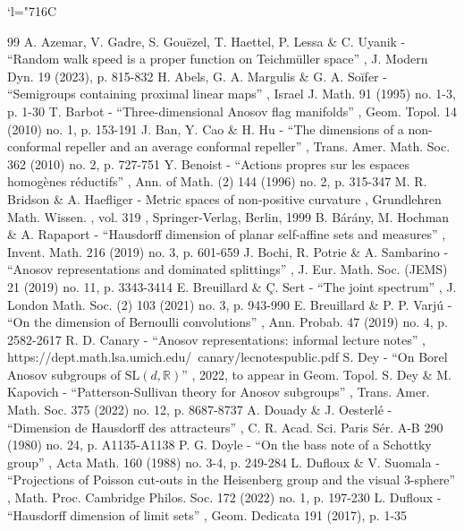 \documentclass[10pt]{amsart}
\newcommand{\Changelback}{\mathcode`l="716C}
\begin{document}
\Changelback


\begin{thebibliography}{99}
 A. Azemar, V. Gadre, S. Gouëzel, T. Haettel, P. Lessa \& C. Uyanik - “Random walk speed is a proper function on Teichmüller space” , J. Modern Dyn. 19 (2023), p. 815-832
 H. Abels, G. A. Margulis \& G. A. Soĭfer - “Semigroups containing proximal linear maps” , Israel J. Math. 91 (1995) no. 1-3, p. 1-30
 T. Barbot - “Three-dimensional Anosov flag manifolds” , Geom. Topol. 14 (2010) no. 1, p. 153-191
 J. Ban, Y. Cao \& H. Hu - “The dimensions of a non-conformal repeller and an average conformal repeller” , Trans. Amer. Math. Soc. 362 (2010) no. 2, p. 727-751
 Y. Benoist - “Actions propres sur les espaces homogènes réductifs” , Ann. of Math. (2) 144 (1996) no. 2, p. 315-347
 M. R. Bridson \& A. Haefliger - Metric spaces of non-positive curvature , Grundlehren Math. Wissen. , vol. 319 , Springer-Verlag, Berlin, 1999
 B. Bárány, M. Hochman \& A. Rapaport - “Hausdorff dimension of planar self-affine sets and measures” , Invent. Math. 216 (2019) no. 3, p. 601-659
 J. Bochi, R. Potrie \& A. Sambarino - “Anosov representations and dominated splittings” , J. Eur. Math. Soc. (JEMS) 21 (2019) no. 11, p. 3343-3414
 E. Breuillard \& Ç. Sert - “The joint spectrum” , J. London Math. Soc. (2) 103 (2021) no. 3, p. 943-990
 E. Breuillard \& P. P. Varjú - “On the dimension of Bernoulli convolutions” , Ann. Probab. 47 (2019) no. 4, p. 2582-2617
 R. D. Canary - “Anosov representations: informal lecture notes” , https://dept.math.lsa.umich.edu/~canary/lecnotespublic.pdf
 S. Dey - “On Borel Anosov subgroups of $\mathrm{SL}(d, \mathbb{R})$” , 2022, to appear in Geom. Topol.
 S. Dey \& M. Kapovich - “Patterson-Sullivan theory for Anosov subgroups” , Trans. Amer. Math. Soc. 375 (2022) no. 12, p. 8687-8737
 A. Douady \& J. Oesterlé - “Dimension de Hausdorff des attracteurs” , C. R. Acad. Sci. Paris Sér. A-B 290 (1980) no. 24, p. A1135-A1138
 P. G. Doyle - “On the bass note of a Schottky group” , Acta Math. 160 (1988) no. 3-4, p. 249-284
 L. Dufloux \& V. Suomala - “Projections of Poisson cut-outs in the Heisenberg group and the visual 3-sphere” , Math. Proc. Cambridge Philos. Soc. 172 (2022) no. 1, p. 197-230
 L. Dufloux - “Hausdorff dimension of limit sets” , Geom. Dedicata 191 (2017), p. 1-35

\end{thebibliography}
\end{document}

